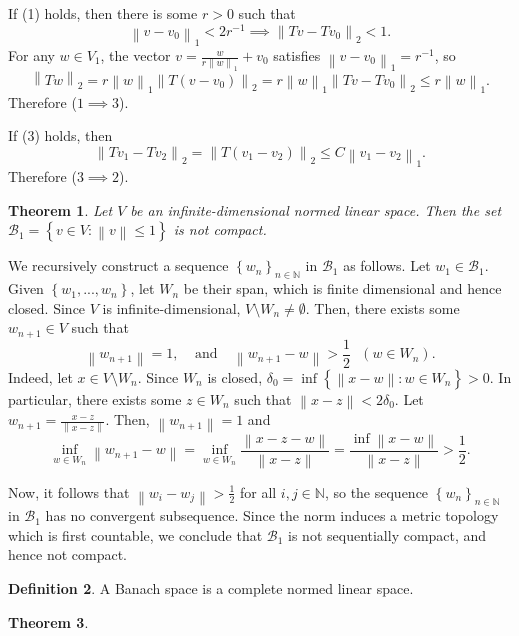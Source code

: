 \documentclass[11pt]{article}
\newtheorem{thm}{Theorem}[subsection]
\theoremstyle{definition}
\newtheorem{defn}[thm]{Definition}
\newcommand{\sm}[0]{\setminus}
\newcommand{\set}[1]{\left\{ #1 \right\}}
\newcommand{\NN}{\mathbb{N}}
\newcommand{\m}[1]{\mathcal{#1}}
\newcommand{\norm}[1]{\left\lVert#1\right\rVert} %
\begin{document}
If (1) holds, then there is some $r>0$ such that
\[
\norm{v-v_0}_1<2r^{-1} \implies \norm{Tv-Tv_0}_2<1 .
\]
For any $w\in V_1$, the vector $v=\frac{w}{r\norm{w}_1}+v_0$ satisfies
$\norm{v-v_0}_1=r^{-1}$, so
\[
\norm{Tw}_2 = r\norm{w}_1\norm{T(v-v_0)}_2
= r\norm{w}_1\norm{Tv-Tv_0}_2 \le r\norm{w}_1 .
\]
Therefore ($1\implies3$).

If (3) holds, then
\[
\norm{Tv_1-Tv_2}_2 = \norm{T(v_1-v_2)}_2
\le C\norm{v_1-v_2}_1 .
\]
Therefore ($3\implies2$).
\qedhere

\begin{thm}
Let $V$ be an infinite-dimensional normed linear space. Then the set $\m{B}_1=\set{v\in
V:\norm{v}\le1}$ is not compact.
\end{thm}
\proof
We recursively construct a sequence $\set{w_n}_{n\in\NN}$ in $\m{B}_1$ as follows. Let
$w_1\in\m{B}_1$. Given $\set{w_1,...,w_n}$, let $W_n$ be their span, which is finite
dimensional and hence closed. Since $V$ is infinite-dimensional, $V\sm W_n\neq\emptyset$.
Then, there exists some $w_{n+1}\in V$ such that
\[
\norm{w_{n+1}}=1, ~~~~~\text{and}~~~~~
\norm{w_{n+1}-w}>\frac12 ~~~(w\in W_n) .
\]
Indeed, let $x\in V\sm W_n$. Since $W_n$ is closed, $\delta_0=\inf\set{\norm{x-w}:w\in
W_n}>0$. In particular, there exists some $z\in W_n$ such that $\norm{x-z}<2\delta_0$. Let
$w_{n+1}=\frac{x-z}{\norm{x-z}}$. Then, $\norm{w_{n+1}}=1$ and
\[
\inf_{w\in W_n}\norm{w_{n+1}-w}
= \inf_{w\in W_n} \frac{\norm{x-z-w}}{\norm{x-z}}
= \frac{\inf\norm{x-w}}{\norm{x-z}} > \frac12 .
\]

Now, it follows that $\norm{w_i-w_j}>\frac12$ for all $i,j\in\NN$, so the sequence
$\set{w_n}_{n\in\NN}$ in $\m{B}_1$ has no convergent subsequence. Since the norm induces a
metric topology which is first countable, we conclude that $\m{B}_1$ is not sequentially
compact, and hence not compact.
\qedhere

\begin{defn}
A Banach space is a complete normed linear space.
\end{defn}

\begin{thm}
\end{thm}

\end{document}
